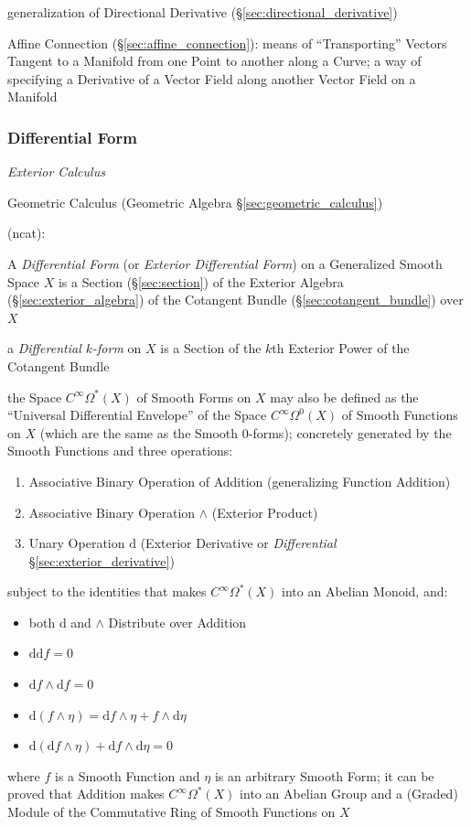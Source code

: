 {generalization of Directional Derivative (\S\ref{sec:directional_derivative})

\fist Affine Connection (\S\ref{sec:affine_connection}): means of
``Transporting'' Vectors Tangent to a Manifold from one Point to another along
a Curve; a way of specifying a Derivative of a Vector Field along another
Vector Field on a Manifold



\subsubsection{Differential Form}\label{sec:differential_form}

\emph{Exterior Calculus}

\fist Geometric Calculus (Geometric Algebra \S\ref{sec:geometric_calculus})

(ncat):

A \emph{Differential Form} (or \emph{Exterior Differential Form}) on a
Generalized Smooth Space $X$ is a Section (\S\ref{sec:section}) of the Exterior
Algebra (\S\ref{sec:exterior_algebra}) of the Cotangent Bundle
(\S\ref{sec:cotangent_bundle}) over $X$

a \emph{Differential $k$-form} on $X$ is a Section of the $k$th Exterior Power
of the Cotangent Bundle

the Space $C^\infty\Omega^*(X)$ of Smooth Forms on $X$ may also be defined as
the ``Universal Differential Envelope'' of the Space $C^\infty\Omega^0(X)$ of
Smooth Functions on $X$ (which are the same as the Smooth $0$-forms); concretely
generated by the Smooth Functions and three operations:
\begin{enumerate}
  \item Associative Binary Operation of Addition (generalizing Function
    Addition)
  \item Associative Binary Operation $\wedge$ (Exterior Product)
  \item Unary Operation $\mathrm{d}$ (Exterior Derivative or \emph{Differential}
    \S\ref{sec:exterior_derivative})
\end{enumerate}
subject to the identities that makes $C^\infty\Omega^*(X)$ into an Abelian
Monoid, and:
\begin{itemize}
  \item both $\mathrm{d}$ and $\wedge$ Distribute over Addition
  \item $\mathrm{dd} f = 0$
  \item $\mathrm{d}f \wedge \mathrm{d}f = 0$
  \item
    $\mathrm{d}(f\wedge\eta) = \mathrm{d}f\wedge\eta + f \wedge \mathrm{d}\eta$
  \item
    $\mathrm{d}(\mathrm{d}f\wedge\eta) + \mathrm{d}f\wedge\mathrm{d}\eta = 0$
\end{itemize}
where $f$ is a Smooth Function and $\eta$ is an arbitrary Smooth Form; it can be
proved that Addition makes $C^\infty\Omega^*(X)$ into an Abelian Group and a
(Graded) Module of the Commutative Ring of Smooth Functions on $X$

}
